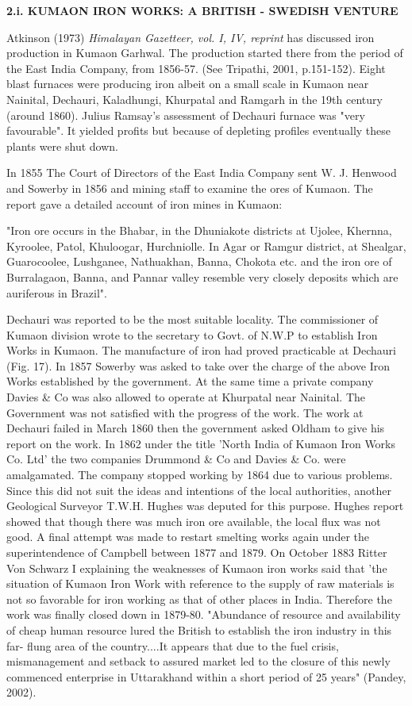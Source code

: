 \textbf{2.i. KUMAON IRON WORKS: A BRITISH - SWEDISH VENTURE}

Atkinson (1973) \textit{Himalayan Gazetteer, vol. I, IV, reprint} has discussed iron production in Kumaon Garhwal. The production started there from the period of the East India Company, from 1856-57. (See Tripathi, 2001, p.151-152). Eight blast furnaces were producing iron albeit on a small scale in Kumaon near Nainital, Dechauri, Kaladhungi, Khurpatal and Ramgarh in the 19th century (around 1860). Julius Ramsay's assessment of Dechauri furnace was "very favourable". It yielded profits but because of depleting profiles eventually these plants were shut down.

In 1855 The Court of Directors of the East India Company sent W. J. Henwood and Sowerby in 1856 and mining staff to examine the ores of Kumaon. The report gave a detailed account of iron mines in Kumaon:

"Iron ore occurs in the Bhabar, in the Dhuniakote districts at Ujolee, Khernna, Kyroolee, Patol, Khuloogar, Hurchniolle. In Agar or Ramgur district, at Shealgar, Guarocoolee, Lushganee, Nathuakhan, Banna, Chokota etc. and the iron ore of Burralagaon, Banna, and Pannar valley resemble very closely deposits which are auriferous in Brazil".

Dechauri was reported to be the most suitable locality. The commissioner of Kumaon division wrote to the secretary to Govt. of N.W.P to establish Iron Works in Kumaon. The manufacture of iron had proved practicable at Dechauri (Fig. 17). In 1857 Sowerby was asked to take over the charge of the above Iron Works established by the government. At the same time a private company Davies \& Co was also allowed to operate at Khurpatal near Nainital. The Government was not satisfied with the progress of the work. The work at Dechauri failed in March 1860 then the government asked Oldham to give his report on the work. In 1862 under the title 'North India of Kumaon Iron Works Co. Ltd' the two companies Drummond \& Co and Davies \& Co. were amalgamated. The company stopped working by 1864 due to various problems. Since this did not suit the ideas and intentions of the local authorities, another Geological Surveyor T.W.H. Hughes was deputed for this purpose. Hughes report showed that though there was much iron ore available, the local flux was not good. A final attempt was made to restart smelting works again under the superintendence of Campbell between 1877 and 1879. On October 1883 Ritter Von Schwarz I explaining the weaknesses of Kumaon iron works said that 'the situation of Kumaon Iron Work with reference to the supply of raw materials is not so favorable for iron working as that of other places in India. Therefore the work was finally closed down in 1879-80. "Abundance of resource and availability of cheap human resource lured the British to establish the iron industry in this far- flung area of the country....It appears that due to the fuel crisis, mismanagement and setback to assured market led to the closure of this newly commenced enterprise in Uttarakhand within a short period of 25 years" (Pandey, 2002).

